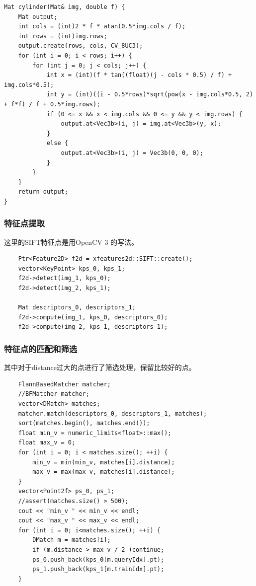 \documentclass{article}
\begin{document}
\begin{lstlisting}
Mat cylinder(Mat& img, double f) {
    Mat output;
    int cols = (int)2 * f * atan(0.5*img.cols / f);
    int rows = (int)img.rows;
    output.create(rows, cols, CV_8UC3);
    for (int i = 0; i < rows; i++) {
        for (int j = 0; j < cols; j++) {
            int x = (int)(f * tan((float)(j - cols * 0.5) / f) + img.cols*0.5);
            int y = (int)((i - 0.5*rows)*sqrt(pow(x - img.cols*0.5, 2) + f*f) / f + 0.5*img.rows);
            if (0 <= x && x < img.cols && 0 <= y && y < img.rows) {
                output.at<Vec3b>(i, j) = img.at<Vec3b>(y, x);
            }
            else {
                output.at<Vec3b>(i, j) = Vec3b(0, 0, 0);
            }
        }
    }
    return output;
}
\end{lstlisting}
\subsubsection{特征点提取}
这里的SIFT特征点是用OpenCV 3 的写法。
\begin{lstlisting}
    Ptr<Feature2D> f2d = xfeatures2d::SIFT::create();
    vector<KeyPoint> kps_0, kps_1;
    f2d->detect(img_1, kps_0);
    f2d->detect(img_2, kps_1);

    Mat descriptors_0, descriptors_1;
    f2d->compute(img_1, kps_0, descriptors_0);
    f2d->compute(img_2, kps_1, descriptors_1);
\end{lstlisting}
\subsubsection{特征点的匹配和筛选}
其中对于distance过大的点进行了筛选处理，保留比较好的点。
\begin{lstlisting}
    FlannBasedMatcher matcher;
    //BFMatcher matcher;
    vector<DMatch> matches;
    matcher.match(descriptors_0, descriptors_1, matches);
    sort(matches.begin(), matches.end());
    float min_v = numeric_limits<float>::max();
    float max_v = 0;
    for (int i = 0; i < matches.size(); ++i) {
        min_v = min(min_v, matches[i].distance);
        max_v = max(max_v, matches[i].distance);
    }
    vector<Point2f> ps_0, ps_1;
    //assert(matches.size() > 500);
    cout << "min_v " << min_v << endl;
    cout << "max_v " << max_v << endl;
    for (int i = 0; i<matches.size(); ++i) {
        DMatch m = matches[i];
        if (m.distance > max_v / 2 )continue;
        ps_0.push_back(kps_0[m.queryIdx].pt);
        ps_1.push_back(kps_1[m.trainIdx].pt);
    }
\end{lstlisting}
\end{document}
